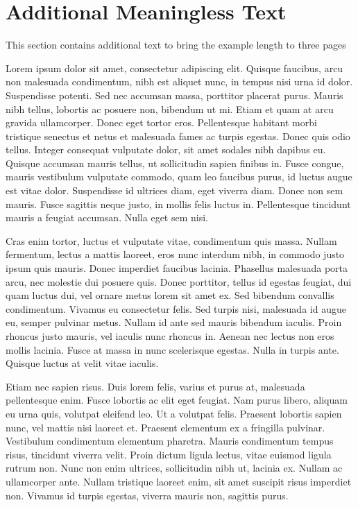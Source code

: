 \documentclass{modelica}
\begin{document}
\section{Additional Meaningless Text}
This section contains additional text to bring the example length to three pages



Lorem ipsum dolor sit amet, consectetur adipiscing elit. Quisque faucibus, arcu non malesuada condimentum, nibh est aliquet nunc, in tempus nisi urna id dolor. Suspendisse potenti. Sed nec accumsan massa, porttitor placerat purus. Mauris nibh tellus, lobortis ac posuere non, bibendum ut mi. Etiam et quam at arcu gravida ullamcorper. Donec eget tortor eros. Pellentesque habitant morbi tristique senectus et netus et malesuada fames ac turpis egestas. Donec quis odio tellus. Integer consequat vulputate dolor, sit amet sodales nibh dapibus eu. Quisque accumsan mauris tellus, ut sollicitudin sapien finibus in. Fusce congue, mauris vestibulum vulputate commodo, quam leo faucibus purus, id luctus augue est vitae dolor. Suspendisse id ultrices diam, eget viverra diam. Donec non sem mauris. Fusce sagittis neque justo, in mollis felis luctus in. Pellentesque tincidunt mauris a feugiat accumsan. Nulla eget sem nisi.

Cras enim tortor, luctus et vulputate vitae, condimentum quis massa. Nullam fermentum, lectus a mattis laoreet, eros nunc interdum nibh, in commodo justo ipsum quis mauris. Donec imperdiet faucibus lacinia. Phasellus malesuada porta arcu, nec molestie dui posuere quis. Donec porttitor, tellus id egestas feugiat, dui quam luctus dui, vel ornare metus lorem sit amet ex. Sed bibendum convallis condimentum. Vivamus eu consectetur felis. Sed turpis nisi, malesuada id augue eu, semper pulvinar metus. Nullam id ante sed mauris bibendum iaculis. Proin rhoncus justo mauris, vel iaculis nunc rhoncus in. Aenean nec lectus non eros mollis lacinia. Fusce at massa in nunc scelerisque egestas. Nulla in turpis ante. Quisque luctus at velit vitae iaculis.

Etiam nec sapien risus. Duis lorem felis, varius et purus at, malesuada pellentesque enim. Fusce lobortis ac elit eget feugiat. Nam purus libero, aliquam eu urna quis, volutpat eleifend leo. Ut a volutpat felis. Praesent lobortis sapien nunc, vel mattis nisi laoreet et. Praesent elementum ex a fringilla pulvinar. Vestibulum condimentum elementum pharetra. Mauris condimentum tempus risus, tincidunt viverra velit. Proin dictum ligula lectus, vitae euismod ligula rutrum non. Nunc non enim ultrices, sollicitudin nibh ut, lacinia ex. Nullam ac ullamcorper ante. Nullam tristique laoreet enim, sit amet suscipit risus imperdiet non. Vivamus id turpis egestas, viverra mauris non, sagittis purus.
\end{document}
